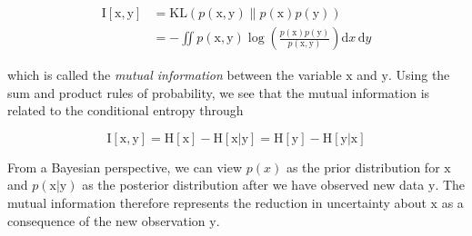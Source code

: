\documentclass{article}
\begin{document}
\begin{align}
    \mathrm{I}[\mathrm{x}, \mathrm{y}] &=
                                         \mathrm{KL}(p(\mathrm{x},\mathrm{y}) \parallel
                                         p(\mathrm{x})p(\mathrm{y}))
                                         \nonumber \\
& = - \iint p(\mathrm{x},\mathrm{y}) \log \left (
  \frac{p(\mathrm{x})p(\mathrm{y})}{p(\mathrm{x}, \mathrm{y})} \right
  ) \mathrm{d} x \, \mathrm{d} y \label{eq:mutual-info}
\end{align}

which is called the \textit{mutual information} between the variable
$\mathrm{x}$ and $\mathrm{y}$. Using the sum and product rules of
probability, we see that the mutual information is related to the
conditional entropy through

\begin{equation}
  \mathrm{I}[\mathrm{x}, \mathrm{y}] = \mathrm{H}[\mathrm{x}] -
  \mathrm{H}[\mathrm{x|y}] = \mathrm{H}[\mathrm{y}] -
  \mathrm{H}[\mathrm{y|x}]
\end{equation}

From a Bayesian perspective, we can view $p(x)$ as the prior
distribution for $\mathrm{x}$ and $p(\mathrm{x}|\mathrm{y})$ as the posterior
distribution after we have observed new data $\mathrm{y}$. The mutual
information therefore represents the reduction in uncertainty about
$\mathrm{x}$ as a consequence of the new observation $\mathrm{y}$.



\end{document}
